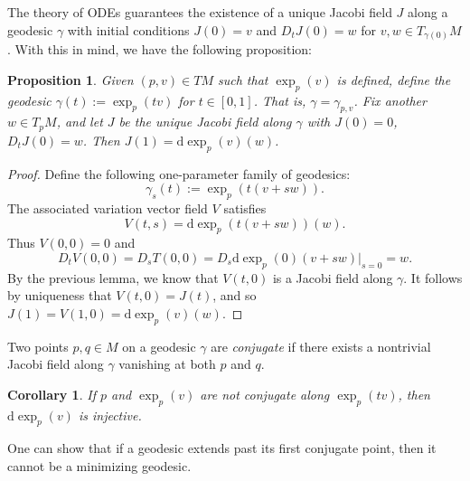 \documentclass{book}
\renewcommand{\d}{\mathrm{d}}
\newtheorem{proposition}[theorem]{Proposition}
\newtheorem{corollary}[theorem]{Corollary}
\theoremstyle{definition}
\numberwithin{equation}{section}
\begin{document}
The theory of ODEs guarantees the existence of a unique Jacobi field $J$ along a geodesic $\gamma$ with initial conditions $J(0) = v$ and $D_t J(0) = w$ for $v,w \in T_{\gamma(0)}M$. With this in mind, we have the following proposition:
\begin{proposition}
    Given $(p,v) \in TM$ such that $\exp_p(v)$ is defined, define the geodesic $\gamma(t) := \exp_p(tv)$ for $t \in [0,1]$. That is, $\gamma = \gamma_{p,v}$. Fix another $w \in T_p M$, and let $J$ be the unique Jacobi field along $\gamma$ with $J(0) = 0$, $D_t J(0) = w$. Then $J(1) = \d\exp_p(v)(w)$.
\end{proposition}
\begin{proof}
    Define the following one-parameter family of geodesics:
    \begin{equation}
        \gamma_s(t) := \exp_p(t(v + sw)).
    \end{equation}
    The associated variation vector field $V$ satisfies 
    \begin{equation}
        V(t,s) = \d\exp_p(t(v+sw))(w).
    \end{equation}
    Thus $V(0,0) = 0$ and 
    \begin{equation}
        D_t V(0,0) = D_s T(0,0) = D_s \d\exp_p(0)(v+sw) \vert_{s = 0} = w.
    \end{equation}
    By the previous lemma, we know that $V(t,0)$ is a Jacobi field along $\gamma$. It follows by uniqueness that $V(t,0) = J(t)$, and so $J(1) = V(1,0) = \d\exp_p(v)(w)$.
\end{proof}
Two points $p,q \in M$ on a geodesic $\gamma$ are \textit{conjugate} if there exists a nontrivial Jacobi field along $\gamma$ vanishing at both $p$ and $q$.
\begin{corollary} \label{cor:conjugacyAndInjectivity}
    If $p$ and $\exp_p(v)$ are not conjugate along $\exp_p(tv)$, then $\d\exp_p(v)$ is injective.
\end{corollary}
One can show that if a geodesic extends past its first conjugate point, then it cannot be a minimizing geodesic.
\end{document}
